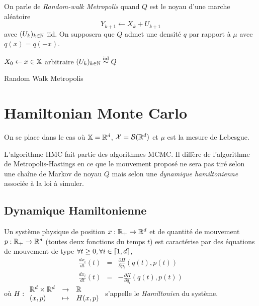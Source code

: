 \documentclass[10pt,a4paper]{article}
\begin{document}
\begin{Def}
  On parle de \emph{Random-walk Metropolis} quand $Q$ est le noyau d'une marche aléatoire
  $$Y_{k+1} \leftarrow X_k + U_{k+1}$$
  avec $(U_k)_{k \in \mathbb{N}}$ iid. On supposera que $Q$ admet une densité $q$ par rapport à $\mu$ avec $q(x) = q(-x)$.
\end{Def}

\begin{center}
\begin{algorithm}[H]
  $X_0 \leftarrow x \in \mathbb{X}$ arbitraire\;
  $(U_k)_{k \in \mathbb{N}} \stackrel{\rm iid}{\sim} Q$ \;
  \caption{Random Walk Metropolis}
  \label{algo:metropolis}
\end{algorithm}
\end{center}

\section{Hamiltonian Monte Carlo}

On se place dans le cas où $\mathbb{X} = \mathbb{R}^d$, $\mathcal{X} = \mathcal{B}(\mathbb{R}^d)$ et $\mu$ est la mesure de Lebesgue. 

L'algorithme HMC fait partie des algorithmes MCMC. Il diffère de l'algorithme de Metropolis-Hastings en ce que le mouvement proposé ne sera pas tiré selon une chaîne de Markov de noyau $Q$ mais selon une \emph{dynamique hamiltonienne} associée à la loi à simuler.

\subsection{Dynamique Hamiltonienne}
Un système physique de position $x : \mathbb{R}_+ \to \mathbb{R}^d$ et de quantité de mouvement $p : \mathbb{R}_+ \to \mathbb{R}^d$ (toutes deux fonctions du temps $t$) est caractérise par des équations de mouvement de type $\forall t \geq 0, \forall i \in {\left\llbracket 1,d \right\rrbracket}$, 
\begin{eqnarray*}
  \frac{d x_i}{d t}(t) &=& \frac{\partial H}{\partial p_i} (q(t), p(t)) \\
  \frac{d x_i}{d t} (t) &=& -\frac{\partial H}{\partial q_i} (q(t), p(t))
\end{eqnarray*}
où $H : { \begin{array}{lcl} \mathbb{R}^d \times \mathbb{R}^d & \to & \mathbb{R} \\ (x,p) & \mapsto & H(x,p) \end{array} }$ s'appelle le {\it Hamiltonien} du système.
\end{document}
